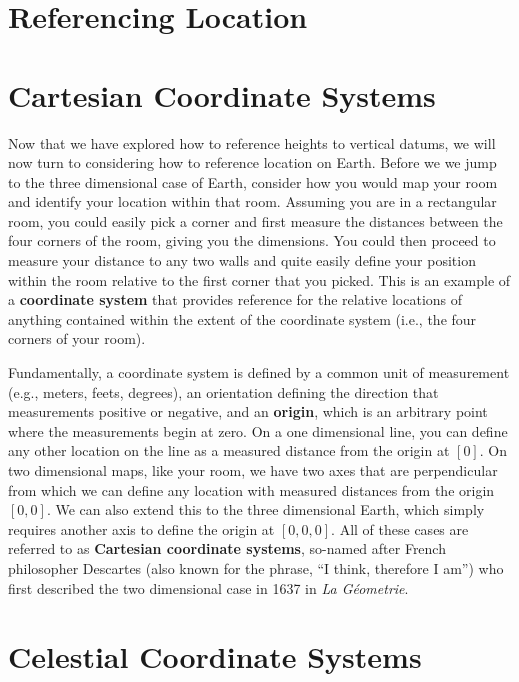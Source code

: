 \documentclass[
]{book}
\begin{document}
\hypertarget{referencing-location}{%
\section{Referencing Location}\label{referencing-location}}

\hypertarget{cartesian-coordinate-systems}{%
\section{Cartesian Coordinate Systems}\label{cartesian-coordinate-systems}}

Now that we have explored how to reference heights to vertical datums, we will now turn to considering how to reference location on Earth. Before we we jump to the three dimensional case of Earth, consider how you would map your room and identify your location within that room. Assuming you are in a rectangular room, you could easily pick a corner and first measure the distances between the four corners of the room, giving you the dimensions. You could then proceed to measure your distance to any two walls and quite easily define your position within the room relative to the first corner that you picked. This is an example of a \textbf{coordinate system} that provides reference for the relative locations of anything contained within the extent of the coordinate system (i.e., the four corners of your room).

Fundamentally, a coordinate system is defined by a common unit of measurement (e.g., meters, feets, degrees), an orientation defining the direction that measurements positive or negative, and an \textbf{origin}, which is an arbitrary point where the measurements begin at zero. On a one dimensional line, you can define any other location on the line as a measured distance from the origin at \([0]\). On two dimensional maps, like your room, we have two axes that are perpendicular from which we can define any location with measured distances from the origin \([0,0]\). We can also extend this to the three dimensional Earth, which simply requires another axis to define the origin at \([0,0,0]\). All of these cases are referred to as \textbf{Cartesian coordinate systems}, so-named after French philosopher Descartes (also known for the phrase, ``I think, therefore I am'') who first described the two dimensional case in 1637 in \emph{La Géometrie}.

\hypertarget{celestial-coordinate-systems}{%
\section{Celestial Coordinate Systems}\label{celestial-coordinate-systems}}
\end{document}
